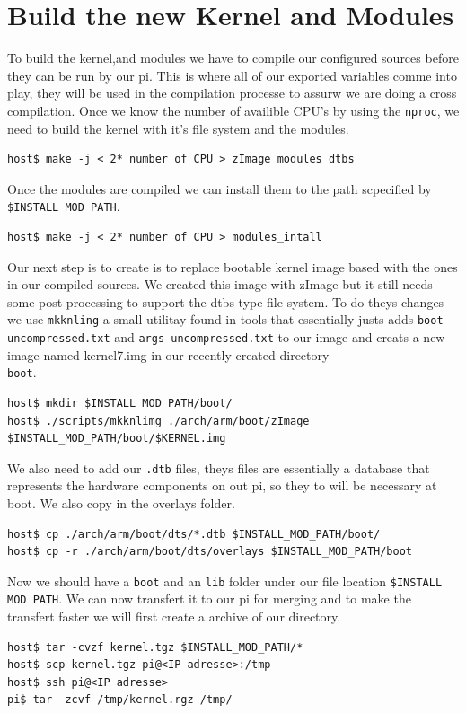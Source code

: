 \documentclass[a4paper,oneside,onecolumn]{article}
\newcommand{\code}[1]{\colorbox{codegray}{\texttt{#1}}}
\begin{document}
\newpage
\section{Build the new Kernel and Modules}

To build the kernel,and modules we have to compile our configured sources before they can be run by our pi.  This is where all of our exported variables comme into play, they will be used in the compilation processe to assurw we are doing a cross compilation.\newline
Once we know the number of availible CPU's by using the \code{nproc}, we need to build the kernel with it's file system and the modules.
\begin{lstlisting}
host$ make -j < 2* number of CPU > zImage modules dtbs
\end{lstlisting}
Once the modules are compiled we can install them to the path scpecified by \code{\$INSTALL MOD PATH}.
\begin{lstlisting}
host$ make -j < 2* number of CPU > modules_intall
\end{lstlisting}
Our next step is to create is to replace bootable kernel image based with the ones in our compiled sources. We created this image with zImage but it still needs some post-processing to support the dtbs type file system. To do theys changes we use \code{mkknling} a small utilitay found in tools that essentially justs adds \texttt{boot-uncompressed.txt} and \texttt{args-uncompressed.txt} to our image and creats a new image named kernel7.img in our recently created directory \texttt{\\boot}.
\begin{lstlisting}
host$ mkdir $INSTALL_MOD_PATH/boot/
host$ ./scripts/mkknlimg ./arch/arm/boot/zImage $INSTALL_MOD_PATH/boot/$KERNEL.img
\end{lstlisting}
We also need to add our \code{.dtb} files, theys files are essentially a database that represents the hardware components on out pi, so they to will be necessary at boot. We also copy in the overlays folder.
\begin{lstlisting}
host$ cp ./arch/arm/boot/dts/*.dtb $INSTALL_MOD_PATH/boot/
host$ cp -r ./arch/arm/boot/dts/overlays $INSTALL_MOD_PATH/boot
\end{lstlisting}
Now we should have a \texttt{boot} and an \texttt{lib} folder under our file location \texttt{\$INSTALL MOD PATH}. We can now transfert it to our pi for merging and to make the transfert faster we will first create a archive of our directory.
\begin{lstlisting}
host$ tar -cvzf kernel.tgz $INSTALL_MOD_PATH/*
host$ scp kernel.tgz pi@<IP adresse>:/tmp
host$ ssh pi@<IP adresse>
pi$ tar -zcvf /tmp/kernel.rgz /tmp/
\end{lstlisting}
\end{document}
